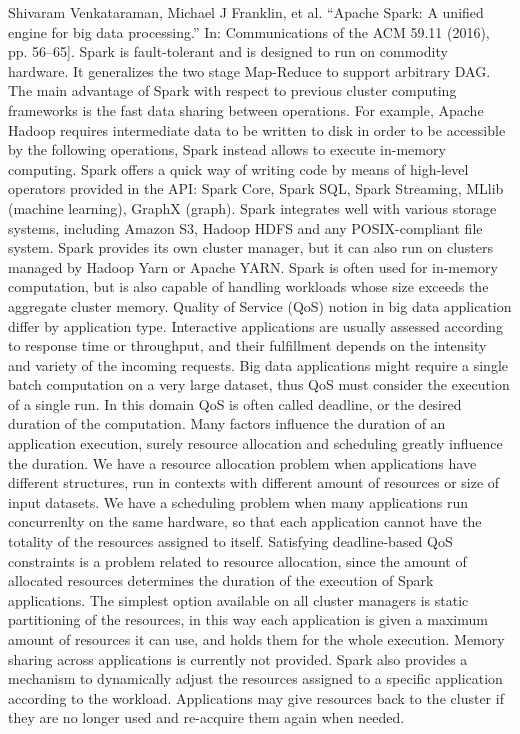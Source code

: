 Shivaram Venkataraman, Michael J Franklin, et al. “Apache Spark: A unified engine for big data processing.” In: Communications of the ACM 59.11 (2016), pp. 56–65]. Spark is fault-tolerant and is designed to run on commodity hardware. It generalizes the two stage Map-Reduce to support arbitrary DAG. The main advantage of Spark with respect to previous cluster computing frameworks is the fast data sharing between operations. For example, Apache Hadoop requires intermediate data to be written to disk in order to be accessible by the following operations, Spark instead allows to execute in-memory computing. Spark offers a quick way of writing code by means of high-level operators provided in the API: Spark Core, Spark SQL, Spark Streaming, MLlib (machine learning), GraphX (graph). Spark integrates well with various storage systems,  including Amazon S3, Hadoop HDFS and any POSIX-compliant file system. Spark provides its own cluster manager, but it can also run on clusters managed by Hadoop Yarn or Apache YARN. Spark is often used for in-memory computation, but is also capable of handling workloads whose size exceeds the aggregate cluster memory. Quality of Service (QoS) notion in big data application differ by application type. Interactive applications are usually assessed according to response time or throughput, and their fulfillment depends on the intensity and variety of the incoming requests. Big data applications might require a single batch computation on a very large dataset, thus QoS must consider the execution of a single run. In this domain QoS is often called deadline, or the desired duration of the computation. Many factors influence the duration of an application execution, surely resource allocation and scheduling greatly influence the duration. We have a resource allocation problem when applications have different structures, run in contexts with different amount of resources or size of input datasets. We have a scheduling problem when many applications run concurrenlty on the same hardware, so that each application cannot have the totality of the resources assigned to itself. Satisfying deadline-based QoS constraints is a problem related to resource allocation, since the amount of allocated resources determines the duration of the execution of Spark applications. The simplest option available on all cluster managers is static partitioning of the resources, in this way each application is given a maximum amount of resources it can use, and holds them for the whole execution. Memory sharing across applications is currently not provided. Spark also provides a mechanism to dynamically adjust the resources assigned to a specific application according to the workload. Applications may give resources back to the cluster if they are no longer used and re-acquire them again when needed. 

